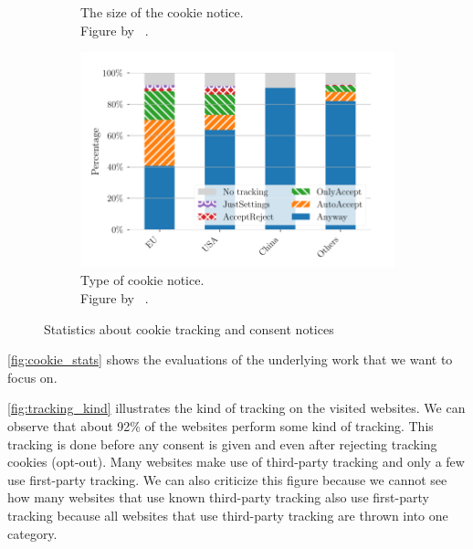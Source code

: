 \begin{figure}
\begin{subfigure}[b]{.5\textwidth}
        \caption{The size of the cookie notice.\\Figure by \citeauthor{sanchez2019can}~\cite[Fig.~2a]{sanchez2019can}.}
        \label{fig:notice_size}
    \end{subfigure}
    \begin{subfigure}[b]{.5\textwidth}
        \centering
        \includegraphics[width=\textwidth, scale=0.3]{figures/cookie_notice_type_trans.png}
        \caption{Type of cookie notice.\\Figure by \citeauthor{sanchez2019can}~\cite[Fig.~2b]{sanchez2019can}.}
        \label{fig:notice_type}
    \end{subfigure}
    \caption{Statistics about cookie tracking and consent notices}
    \label{fig:cookie_stats}
\end{figure}

\autoref{fig:cookie_stats} shows the evaluations of the underlying work that we want to focus on.

\autoref{fig:tracking_kind} illustrates the kind of tracking on the visited websites. We can observe that about 92\% of
the websites perform some kind of tracking. This tracking is done before any consent is given and even after rejecting
tracking cookies (opt-out). Many websites make use of third-party tracking and only a few use first-party tracking. We
can also criticize this figure because we cannot see how many websites that use known third-party tracking also use
first-party tracking because all websites that use third-party tracking are thrown into one category.

